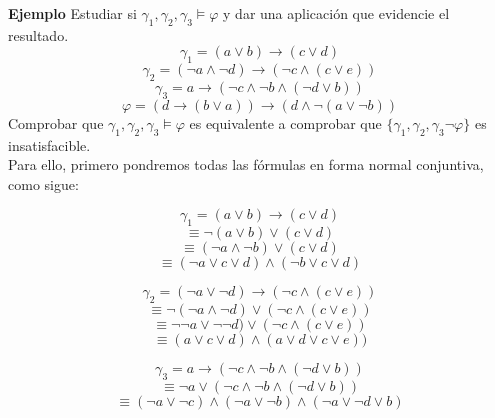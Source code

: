 \documentclass[a4paper]{article}
\begin{document}
\large{\textbf{Ejemplo}}
Estudiar si $\gamma_1,\gamma_2,\gamma_3\models\varphi$ y dar una aplicación que evidencie el resultado.
$$\gamma_1=(a\lor b)\rightarrow(c\lor d)$$
$$\gamma_2=(\neg a\land\neg d)\rightarrow(\neg c\land(c\lor e))$$
$$\gamma_3= a \rightarrow(\neg c\land\neg b\land(\neg d\lor b))$$
$$\varphi=(d\rightarrow(b\lor a))\rightarrow(d\land\neg(a\lor\neg b))$$
Comprobar que $\gamma_1,\gamma_2,\gamma_3\models\varphi$ es equivalente a comprobar que $\{\gamma_1,\gamma_2,\gamma_3\neg\varphi\}$ es insatisfacible.\\
Para ello, primero pondremos todas las fórmulas en forma normal conjuntiva, como sigue:

$$\gamma_1=(a\lor b)\rightarrow(c\lor d)$$
$$\equiv\neg(a\lor b)\lor (c\lor d)$$
$$\equiv (\neg a \land \neg b)\lor(c \lor d)$$
$$\equiv (\neg a\lor c\lor d) \land (\neg b\lor c \lor d)$$

$$\gamma_2=(\neg a\lor\neg d)\rightarrow(\neg c\land(c\lor e))$$
$$\equiv\neg(\neg a\land\neg d)\lor(\neg c\land(c\lor e))$$
$$\equiv\neg\neg a\lor\neg\neg d)\lor(\neg c\land(c\lor e))$$
$$\equiv(a\lor c\lor d)\land(a\lor d\lor c\lor e))$$

$$\gamma_3= a \rightarrow(\neg c\land\neg b\land(\neg d\lor b))$$
$$\equiv\neg a\lor(\neg c\land\neg b\land(\neg d\lor b))$$
$$\equiv(\neg a\lor\neg c)\land(\neg a\lor \neg b)\land(\neg a\lor\neg d\lor b)$$
\end{document}
